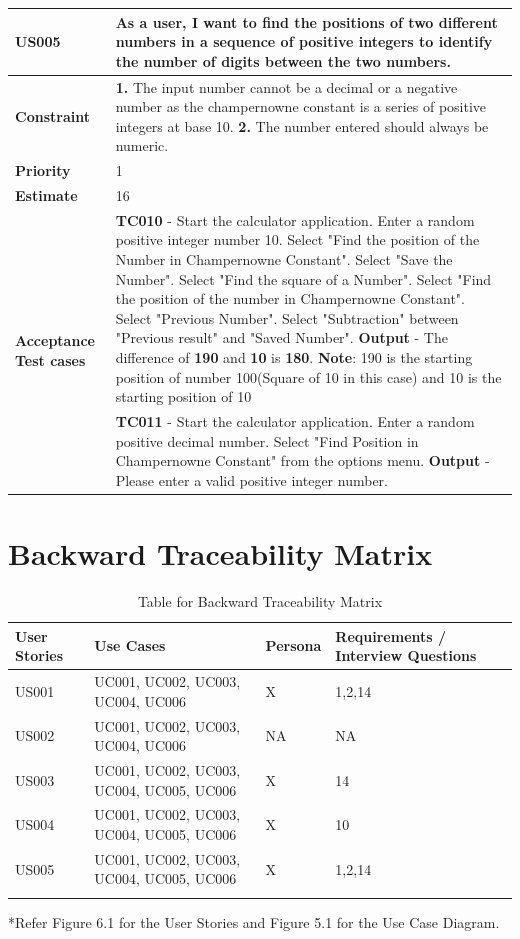 \documentclass[12pt, a4paper]{report}
\begin{document}
\begin{tabular}{|p{3cm}|p{12cm}|}
\hline
     \textbf{US005} &  As a user, I want to find the positions of two different numbers in a sequence of positive integers to identify the number of digits between the two numbers.\\\hline
     \textbf{Constraint} &  \textbf{1. } The input number cannot be a decimal or a negative number as the champernowne constant is a series of positive integers at base 10. \newline \textbf{2. } The number entered should always be numeric.\\\hline
     \textbf{Priority} & 1 \\\hline
     \textbf{Estimate} & 16 \\\hline
     \multirow{2}{3cm}{\textbf{Acceptance Test cases}} & \textbf{TC010} - Start the calculator application. Enter a random positive integer number 10. Select "Find the position of the Number in Champernowne Constant". Select "Save the Number". Select "Find the square of a Number". Select "Find the position of the number in Champernowne Constant". Select "Previous Number". Select "Subtraction" between "Previous result" and  "Saved Number". \newline \textbf{Output} - The difference of \textbf{190} and \textbf{10} is \textbf{180}. \newline \textbf{Note}: 190 is the starting position of number 100(Square of 10 in this case) and 10 is the starting position of 10  \\\cline{2-2}
     & \textbf{TC011} - Start the calculator application. Enter a random positive decimal number. Select "Find Position in Champernowne Constant" from the options menu. \newline \textbf{Output} - Please enter a valid positive integer number.\\\hline
\end{tabular} 

\chapter {Backward Traceability Matrix}

\begin{longtable}{|p{1.5cm}|p{3cm}|p{2cm}|p{4cm}|}

    \hline
    User Stories & Use Cases & Persona & Requirements / Interview Questions \\\hline
    US001 & UC001, UC002, UC003, UC004, UC006 & X & 1,2,14\\\hline
    US002 & UC001, UC002, UC003, UC004, UC006 &NA &NA\\\hline
    US003 & UC001, UC002, UC003, UC004, UC005, UC006 & X & 14\\\hline
    US004 & UC001, UC002, UC003, UC004, UC005, UC006 & X & 10\\\hline
    US005 & UC001, UC002, UC003, UC004, UC005, UC006 & X & 1,2,14\\\hline
\caption{Table for Backward Traceability Matrix}
\label{table:1}
\end{longtable}
{*Refer Figure 6.1 for the User Stories and Figure 5.1 for the Use Case Diagram.}
\end{document}
